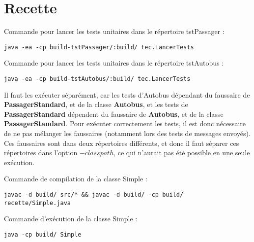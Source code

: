 \documentclass[a4paper,11pts]{article}
\begin{document}
\section{Recette}
Commande pour lancer les tests unitaires dans le répertoire tstPassager : 
\begin{verbatim}
java -ea -cp build-tstPassager/:build/ tec.LancerTests
\end{verbatim}
Commande pour lancer les tests unitaires dans le répertoire tstAutobus : 
\begin{verbatim}
java -ea -cp build-tstAutobus/:build/ tec.LancerTests
\end{verbatim}

Il faut les exécuter séparément, car les tests d'Autobus dépendant du faussaire de \textbf{PassagerStandard}, et de la classe \textbf{Autobus}, et les tests de \textbf{PassagerStandard} dépendent du faussaire de \textbf{Autobus}, et de la classe \textbf{PassagerStandard}. Pour exécuter correctement les tests, il est donc nécessaire de ne pas mélanger les faussaires (notamment lors des tests de messages envoyés). Ces faussaires sont dans deux répertoires différents, et donc il faut séparer ces répertoires dans l'option $-classpath$, ce qui n'aurait pas été possible en une seule exécution.

Commande de compilation de la classe Simple :
\begin{verbatim}
javac -d build/ src/* && javac -d build/ -cp build/ recette/Simple.java
\end{verbatim}
Commande d'exécution de la classe Simple :
\begin{verbatim}
java -cp build/ Simple
\end{verbatim}
\end{document}
